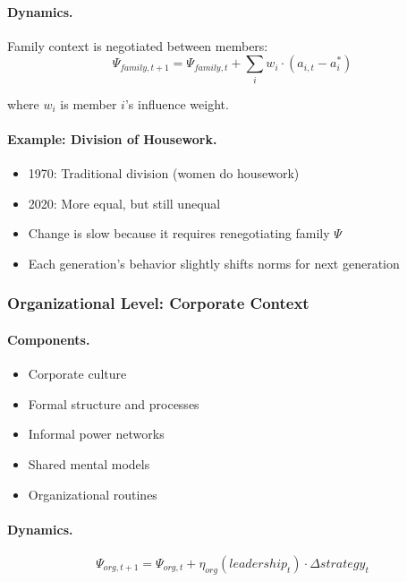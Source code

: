 \documentclass[12pt,a4paper]{article}
\begin{document}
\paragraph{Dynamics.}
Family context is negotiated between members:
\begin{equation}
  \Psi_{family, t+1} = \Psi_{family, t} + \sum_i w_i \cdot (a_{i,t} - a_i^*)
\end{equation}

where $w_i$ is member $i$'s influence weight.

\paragraph{Example: Division of Housework.}
\begin{itemize}
  \item 1970: Traditional division (women do housework)
  \item 2020: More equal, but still unequal
  \item Change is slow because it requires renegotiating family $\Psi$
  \item Each generation's behavior slightly shifts norms for next generation
\end{itemize}

\subsubsection{Organizational Level: Corporate Context}

\paragraph{Components.}
\begin{itemize}
  \item Corporate culture
  \item Formal structure and processes
  \item Informal power networks
  \item Shared mental models
  \item Organizational routines
\end{itemize}

\paragraph{Dynamics.}
\begin{equation}
  \Psi_{org, t+1} = \Psi_{org, t} + \eta_{org}(leadership_t) \cdot \Delta strategy_t
\end{equation}
\end{document}
